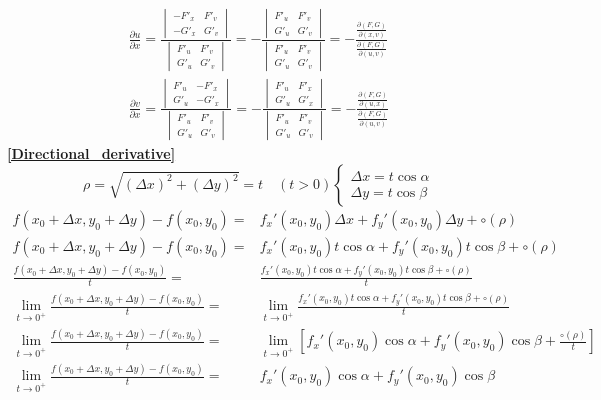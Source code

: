 \begin{align*}
	\frac{\partial u}{\partial x}=\frac{\begin{vmatrix}
			-F'_x & F'_v\\
			-G'_x & G'_v
	\end{vmatrix}}{\begin{vmatrix}
			F'_u & F'_v\\
			G'_u & G'_v
	\end{vmatrix}}=-\frac{\begin{vmatrix}
			F'_u & F'_v\\
			G'_u & G'_v
	\end{vmatrix}}{\begin{vmatrix}
			F'_u & F'_v\\
			G'_u & G'_v
	\end{vmatrix}}=-\frac{\frac{\partial(F,G)}{\partial(x,v)}}{\frac{\partial(F,G)}{\partial(u,v)}}\\
	\frac{\partial v}{\partial x}=\frac{\begin{vmatrix}
			F'_u & -F'_x\\
			G'_u & -G'_x
	\end{vmatrix}}{\begin{vmatrix}
			F'_u & F'_v\\
			G'_u & G'_v
	\end{vmatrix}}=-\frac{\begin{vmatrix}
			F'_u & F'_x\\
			G'_u & G'_x
	\end{vmatrix}}{\begin{vmatrix}
			F'_u & F'_v\\
			G'_u & G'_v
	\end{vmatrix}}=-\frac{\frac{\partial(F,G)}{\partial(u,x)}}{\frac{\partial(F,G)}{\partial(u,v)}}
\end{align*}
\textbf{\large \ref{Directional_derivative}}
	$$\rho=\sqrt{(\Delta x)^2+(\Delta y)^2}=t\quad(t>0)\begin{cases}
	\Delta x=t\cos\alpha\\
	\Delta y=t\cos\beta
\end{cases}$$
\begin{align*}
	f(x_0+\Delta x,y_0+\Delta y)-f(x_0,y_0)=&f_x'(x_0,y_0)\Delta x+f_y'(x_0,y_0)\Delta y+\circ(\rho)\\
	f(x_0+\Delta x,y_0+\Delta y)-f(x_0,y_0)=&f_x'(x_0,y_0)t\cos\alpha+f_y'(x_0,y_0)t\cos\beta+\circ(\rho)\\
	\frac{f(x_0+\Delta x,y_0+\Delta y)-f(x_0,y_0)}{t}=&\frac{f_x'(x_0,y_0)t\cos\alpha+f_y'(x_0,y_0)t\cos\beta+\circ(\rho)}{t}\\
	\lim\limits_{t\to 0^+}\frac{f(x_0+\Delta x,y_0+\Delta y)-f(x_0,y_0)}{t}=&\lim\limits_{t\to 0^+}\frac{f_x'(x_0,y_0)t\cos\alpha+f_y'(x_0,y_0)t\cos\beta+\circ(\rho)}{t}\\
	\lim\limits_{t\to 0^+}\frac{f(x_0+\Delta x,y_0+\Delta y)-f(x_0,y_0)}{t}=&\lim\limits_{t\to 0^+}\left[f_x'(x_0,y_0)\cos\alpha+f_y'(x_0,y_0)\cos\beta+\frac{\circ(\rho)}{t}\right]\\
	\lim\limits_{t\to 0^+}\frac{f(x_0+\Delta x,y_0+\Delta y)-f(x_0,y_0)}{t}=&f_x'(x_0,y_0)\cos\alpha+f_y'(x_0,y_0)\cos\beta
\end{align*}